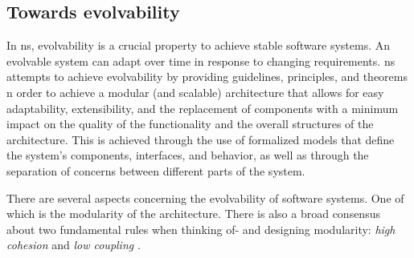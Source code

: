 \subsection{Towards evolvability} \label{sec_on_evolvability}

In \gls{ns}, evolvability is a crucial property to achieve stable software
systems. An evolvable system can adapt over time in response to changing requirements.
\gls{ns} attempts to achieve evolvability by providing guidelines, principles, and theorems
n order to achieve a modular (and scalable) architecture that allows for easy
adaptability, extensibility, and the replacement of components with a minimum impact on the
quality of the functionality and the overall structures of the architecture. This is
achieved through the use of formalized models that define the system's components,
interfaces, and behavior, as well as through the separation of concerns between different
parts of the system.

There are several aspects concerning the evolvability of software systems. One of which is
the modularity of the architecture. There is also a broad consensus about two fundamental
rules when thinking of- and designing modularity: \emph{high cohesion} and \emph{low
coupling} \autocite[22]{mannaert_normalized_2016}.